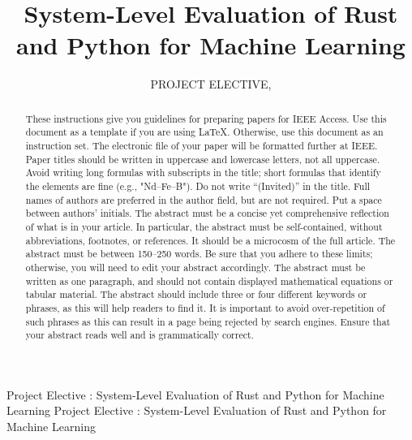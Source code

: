 \documentclass{ieeeaccess}
\begin{document}

\title{System-Level Evaluation of Rust and Python for Machine Learning}
\author{\uppercase{Project Elective},
}
\address[1]{Project Elective (e-mail: project@elective.com)}

\markboth
{Project Elective \headeretal: System-Level Evaluation of Rust and Python for Machine Learning}
{Project Elective \headeretal: System-Level Evaluation of Rust and Python for Machine Learning}


\begin{abstract}
These instructions give you guidelines for preparing papers for 
IEEE Access. Use this document as a template if you are 
using \LaTeX. Otherwise, use this document as an 
instruction set. The electronic file of your paper will be formatted further 
at IEEE. Paper titles should be written in uppercase and lowercase letters, 
not all uppercase. Avoid writing long formulas with subscripts in the title; 
short formulas that identify the elements are fine (e.g., "Nd--Fe--B"). Do 
not write ``(Invited)'' in the title. Full names of authors are preferred in 
the author field, but are not required. Put a space between authors' 
initials. The abstract must be a concise yet comprehensive reflection of 
what is in your article. In particular, the abstract must be self-contained, 
without abbreviations, footnotes, or references. It should be a microcosm of 
the full article. The abstract must be between 150--250 words. Be sure that 
you adhere to these limits; otherwise, you will need to edit your abstract 
accordingly. The abstract must be written as one paragraph, and should not 
contain displayed mathematical equations or tabular material. The abstract 
should include three or four different keywords or phrases, as this will 
help readers to find it. It is important to avoid over-repetition of such 
phrases as this can result in a page being rejected by search engines. 
Ensure that your abstract reads well and is grammatically correct.
\end{abstract}
\end{document}
